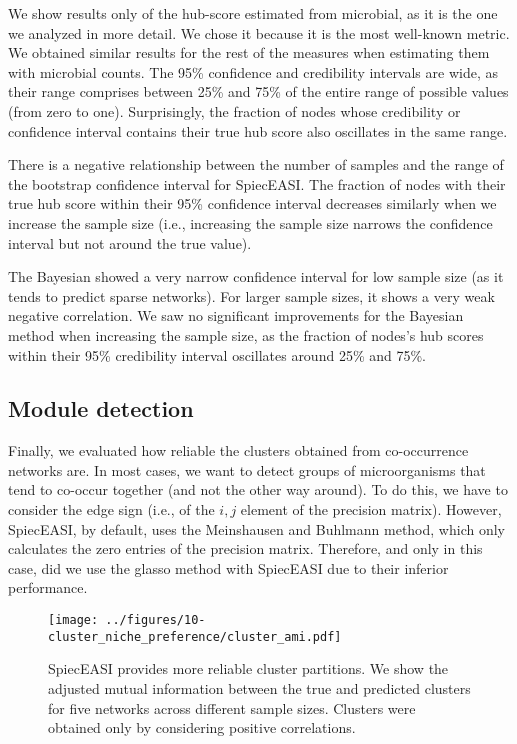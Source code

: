 \documentclass[
  a4paper,
]{article}
\begin{document}
We show results only of the hub-score estimated from microbial, as it is
the one we analyzed in more detail. We chose it because it is the most
well-known metric. We obtained similar results for the rest of the
measures when estimating them with microbial counts. The 95\% confidence
and credibility intervals are wide, as their range comprises between
25\% and 75\% of the entire range of possible values (from zero to one).
Surprisingly, the fraction of nodes whose credibility or confidence
interval contains their true hub score also oscillates in the same
range.

There is a negative relationship between the number of samples and the
range of the bootstrap confidence interval for SpiecEASI. The fraction
of nodes with their true hub score within their 95\% confidence interval
decreases similarly when we increase the sample size (i.e., increasing
the sample size narrows the confidence interval but not around the true
value).

The Bayesian showed a very narrow confidence interval for low sample
size (as it tends to predict sparse networks). For larger sample sizes,
it shows a very weak negative correlation. We saw no significant
improvements for the Bayesian method when increasing the sample size, as
the fraction of nodes's hub scores within their 95\% credibility
interval oscillates around 25\% and 75\%.

\hypertarget{module-detection}{%
\subsection{Module detection}\label{module-detection}}

Finally, we evaluated how reliable the clusters obtained from
co-occurrence networks are. In most cases, we want to detect groups of
microorganisms that tend to co-occur together (and not the other way
around). To do this, we have to consider the edge sign (i.e., of the
\(i, j\) element of the precision matrix). However, SpiecEASI, by
default, uses the Meinshausen and Buhlmann method, which only calculates
the zero entries of the precision matrix. Therefore, and only in this
case, did we use the glasso method with SpiecEASI due to their inferior
performance.

\begin{figure}

{\centering \texttt{[image: ../figures/10-cluster\_niche\_preference/cluster\_ami.pdf]}

}

\caption{\label{fig-ami}SpiecEASI provides more reliable cluster
partitions. We show the adjusted mutual information between the true and
predicted clusters for five networks across different sample sizes.
Clusters were obtained only by considering positive correlations.}

\end{figure}
\end{document}

